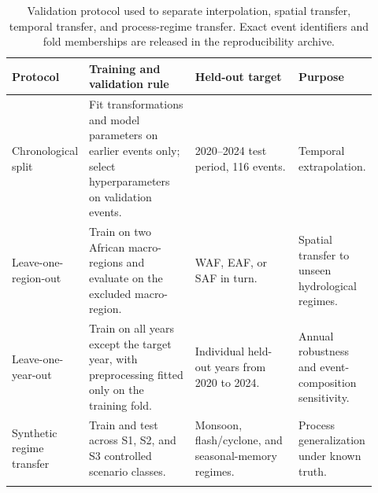 \documentclass[pdflatex,sn-mathphys-ay]{sn-jnl}
\theoremstyle{thmstyleone}
\begin{document}
\begin{table}[p]
\centering
\small
\caption{Validation protocol used to separate interpolation,
spatial transfer, temporal transfer, and process-regime transfer.  Exact
event identifiers and fold memberships are released in the
reproducibility archive.}
\label{tab:validation_protocol}
\begin{tabular}{p{0.21\linewidth}p{0.30\linewidth}p{0.30\linewidth}p{0.11\linewidth}}
\toprule
Protocol & Training and validation rule & Held-out target & Purpose \\
\midrule
Chronological split & Fit transformations and model parameters on earlier events only; select hyperparameters on validation events. & 2020--2024 test period, 116 events. & Temporal extrapolation. \\
Leave-one-region-out & Train on two African macro-regions and evaluate on the excluded macro-region. & WAF, EAF, or SAF in turn. & Spatial transfer to unseen hydrological regimes. \\
Leave-one-year-out & Train on all years except the target year, with preprocessing fitted only on the training fold. & Individual held-out years from 2020 to 2024. & Annual robustness and event-composition sensitivity. \\
Synthetic regime transfer & Train and test across S1, S2, and S3 controlled scenario classes. & Monsoon, flash/cyclone, and seasonal-memory regimes. & Process generalization under known truth. \\
\botrule
\end{tabular}
\end{table}
\end{document}
